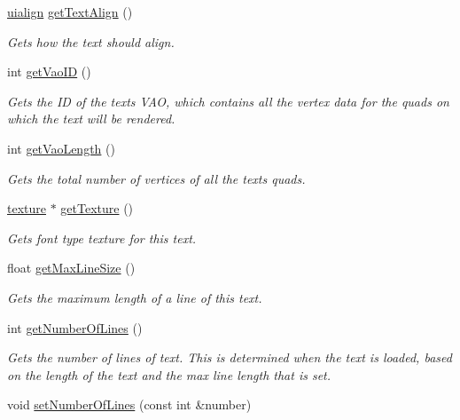 \begin{DoxyCompactItemize}
\hyperlink{namespaceflounder_a70f1871d5c05aa8e078dd37501ce10a9}{uialign} \hyperlink{classflounder_1_1text_a494f99a95dde793f20e9d2a46f34b217}{get\+Text\+Align} ()
\begin{DoxyCompactList}\small\item\em Gets how the text should align. \end{DoxyCompactList}\item 
int \hyperlink{classflounder_1_1text_a6b1a82e19fcfc8b4608ea02d0a8603d9}{get\+Vao\+ID} ()
\begin{DoxyCompactList}\small\item\em Gets the ID of the text\textquotesingle{}s V\+AO, which contains all the vertex data for the quads on which the text will be rendered. \end{DoxyCompactList}\item 
int \hyperlink{classflounder_1_1text_a06b2e74368ca11987c9ad8555ee003ca}{get\+Vao\+Length} ()
\begin{DoxyCompactList}\small\item\em Gets the total number of vertices of all the text\textquotesingle{}s quads. \end{DoxyCompactList}\item 
\hyperlink{classflounder_1_1texture}{texture} $\ast$ \hyperlink{classflounder_1_1text_a9bb772e20f65be7cab18a52ba995af76}{get\+Texture} ()
\begin{DoxyCompactList}\small\item\em Gets font type texture for this text. \end{DoxyCompactList}\item 
float \hyperlink{classflounder_1_1text_a4135aa153773c627b6b83a34b1f2ee1f}{get\+Max\+Line\+Size} ()
\begin{DoxyCompactList}\small\item\em Gets the maximum length of a line of this text. \end{DoxyCompactList}\item 
int \hyperlink{classflounder_1_1text_a19354c6e61de672476d09163291b9346}{get\+Number\+Of\+Lines} ()
\begin{DoxyCompactList}\small\item\em Gets the number of lines of text. This is determined when the text is loaded, based on the length of the text and the max line length that is set. \end{DoxyCompactList}\item 
void \hyperlink{classflounder_1_1text_a5c4722b49473fb68783d921dd50fa329}{set\+Number\+Of\+Lines} (const int \&number)

\end{DoxyCompactItemize}
